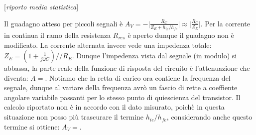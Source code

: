 \documentclass[10pt,a4paper]{article}
\newcommand{\rem}[1]{[\emph{#1}]}
\begin{document}
\rem{riporto media statistica}

Il guadagno atteso per piccoli segnali è $A_V=-\vert \frac{R_C}{Z_E+h_{ie}/h_{fe}} \vert \approx \vert \frac{R_C}{Z_E} \vert$. 
Per la corrente in continua il ramo della resistenza $R_{res}$ è aperto dunque il guadagno non è modificato. La corrente alternata invece vede una impedenza totale: $Z_{E} = (1+\frac{1}{j \omega C})//R_{E}$. Dunque l'impedenza vista dal segnale (in modulo) si abbassa, la parte reale della funzione di risposta del circuito è l'attenuazione che diventa: $A = $. Notiamo che la retta di carico ora contiene la frequenza del segnale, dunque al variare della frequenza avrò un fascio di rette a coeffiente angolare variabile passanti per lo stesso punto di quiescienza del transistor.
Il calcolo riportato non è in accordo con il dato misurato, poichè in questa situazione non posso più trascurare il termine $h_{ie}/h_{fe}$, considerando anche questo termine si ottiene: $A_V = $.
\end{document}
